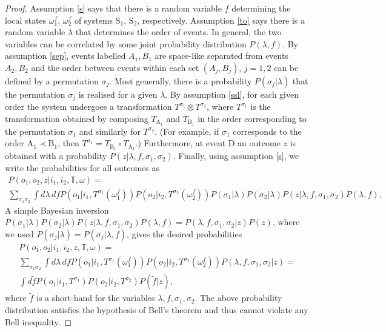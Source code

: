 \documentclass[a4paper,11pt]{article}
\begin{document}
\begin{proof}
Assumption \eqref{s} says that there is a random variable $f$ determining the local states $\omega_1^f$, $\omega_2^f$ of systems $\mathrm S_1$, $\mathrm S_2$, respectively. Assumption \eqref{to} says there is a random variable $\lambda$ that determines the order of events. In general, the two variables can be correlated by some joint probability distribution $P(\lambda,f)$. By assumption \eqref{sep}, events labelled $A_1, B_1$ are space-like separated from events $A_2, B_2$ and the order between events within each set $(A_j, B_j)$, $j=1,2$ can be defined by a permutation $\sigma_j$. Most generally, there is a probability $P(\sigma_j|\lambda)$ that the permutation $\sigma_j$ is realised for a given $\lambda$.  By assumption \eqref{ssl}, for each given order the system undergoes a transformation {$T^{\sigma_1}\otimes T^{\sigma_2}$}, where {$T^{\sigma_1}$} is the transformation obtained by composing {$T_\mathrm{A_1}$} and {$T_\mathrm{B_1}$} in the order corresponding  to the permutation $\sigma_1$ and similarly for {$T^{\sigma_2}$}. (For example, if $\sigma_1$ corresponds to the order $\mathrm {A_1\prec B_1}$, then {$T^{\sigma_1}=T_\mathrm{B_1}\circ T_\mathrm{A_1}$}.)
Furthermore, at event $\mathrm D$ an outcome $z$ is obtained with a probability {$P(z|\lambda, f, \sigma_1, \sigma_2)$}. Finally, using assumption \eqref{s}, we write the probabilities for all outcomes as
%
\begin{multline}
\label{post_to}
 P\left(o_1,o_2, z|i_1,i_2, {\mathbb{T}},\omega\right) = \\
\sum_{\sigma_1\sigma_2} \int \!d\lambda \,df P(o_1|i_1,{T^{\sigma_1}}(\omega_1^f))P(o_2|i_2, {T^{\sigma_2}}(\omega^f_2))P(\sigma_1|\lambda) P(\sigma_2|\lambda)P(z|\lambda,f, {\sigma_1, \sigma_2})P(\lambda, f),
\end{multline}
%
 A simple Bayesian inversion  $P(\sigma_1|\lambda) P(\sigma_2|\lambda)P(z|\lambda,f, \sigma_1, \sigma_2)P(\lambda, f) = P(\lambda, f, \sigma_1, \sigma_2|z)P(z)$, where we used $P(\sigma_j|\lambda)=P(\sigma_j|\lambda,f)$, gives the desired probabilities
\begin{multline}
\label{result}
P\left(o_1,o_2|i_1,i_2, z,  {\mathbb{T}},\omega\right) = \\
 \sum_{\sigma_1\sigma_2} \int \!d\lambda \,df P(o_1|i_1,{T^{\sigma_1}}(\omega_1^f))P(o_2|i_2, {T^{\sigma_2}}(\omega_2^f))P(\lambda, f, \sigma_1, \sigma_2|z) =\\
 \int \!d\tilde{f} P(o_1|i_1,{T^{\sigma_1}})P(o_2|i_2, {T^{\sigma_2}})P(\tilde{f}|z),
\end{multline}
where $\tilde{f}$ is a short-hand for the variables $\lambda, f, \sigma_1, \sigma_2$. The above probability distribution satisfies the hypothesis of Bell's theorem and thus cannot violate any Bell inequality.
\end{proof}
\end{document}
